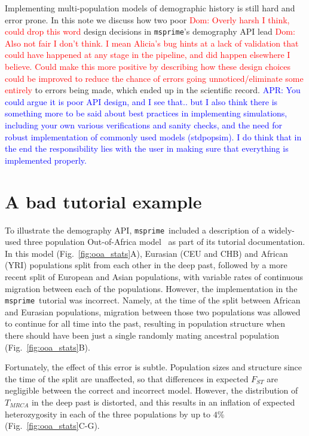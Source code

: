 \documentclass{article}
\newcommand{\msprime}[0]{\texttt{msprime}}
\newcommand{\aprcomment}[1]{{\textcolor{blue}{APR: #1}}}
\newcommand{\dncomment}[1]{{\textcolor{red}{Dom: #1}}}
\begin{document}
Implementing multi-population models of demographic history is still hard and error
prone. In this note we discuss how two poor
\dncomment{Overly harsh I think, could drop this word} design decisions
in \msprime's demography API lead
\dncomment{Also not fair I don't think. I mean Alicia's bug hints at a lack of validation that 
could have happened at any stage in the pipeline, and did happen elsewhere 
I believe. Could make this more positive by describing how these design choices 
could be improved to reduce the chance of errors going unnoticed/eliminate 
some entirely} to errors being made, which ended
up in the scientific record. 
\aprcomment{You could argue it is poor API design, and I see that.. but I also
think there is something more to be said about best practices in implementing simulations, 
including your own various verifications and sanity checks, and the need for robust
implementation of commonly used models (stdpopsim). I do think that in the end
the responsibility lies with the user in making sure that everything is implemented
properly.}

\section{A bad tutorial example}

To illustrate the demography API, \msprime\ included a description of a widely-used
three population Out-of-Africa model~\citep{gutenkunst2009inferring}
as part of its tutorial documentation. In this model (Fig.~\ref{fig:ooa_stats}A),
Eurasian (CEU and CHB) and African (YRI) populations split from each other in the deep past, 
followed by a more recent split of European and Asian populations, with variable rates of 
continuous migration between each of the populations. However, the implementation in the 
\msprime\ tutorial was incorrect. Namely, at the time of the split between African and Eurasian
populations, migration between those two populations was allowed to continue for all time into the
past, resulting in population structure when there should have been just a single 
randomly mating ancestral population (Fig.~\ref{fig:ooa_stats}B).

Fortunately, the effect of this error is subtle. Population sizes and structure since the time of 
the split are unaffected, so that differences in expected $F_{ST}$ are negligible between 
the correct and incorrect model. However, the distribution of $T_{MRCA}$ in the deep past
is distorted, and this results in an inflation of expected heterozygosity in each of the three
populations by up to $4\%$ (Fig.~\ref{fig:ooa_stats}C-G).
\end{document}

